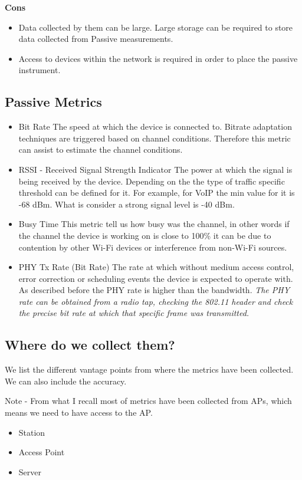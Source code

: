 \textbf{Cons}
\begin{itemize}
	\item Data collected by them can be large. Large storage can be required to store data collected from Passive measurements.
	\item Access to devices within the network is required in order to place the passive instrument.
	
\end{itemize}

\subsection*{Passive Metrics}

\begin{itemize}
	\item Bit Rate
	The speed at which the device is connected to. Bitrate adaptation techniques are triggered based on channel conditions. Therefore this metric can assist to estimate the channel conditions.
	\item RSSI - Received Signal Strength Indicator
	The power at which the signal is being received by the device. Depending on the the type of traffic specific threshold can be defined for it. For example, for VoIP the min value for it is -68 dBm. What is consider a strong signal level is -40 dBm.
	\item Busy Time
	This metric tell us how busy was the channel, in other words if the channel the device is working on is close to 100\% it can be due to contention by other Wi-Fi devices or interference from non-Wi-Fi sources.
	\item PHY Tx Rate (Bit Rate)
	The rate at which without medium access control, error correction or scheduling events the device is expected to operate with. As described before the PHY rate is higher than the bandwidth.
	\emph{The PHY rate can be obtained from a radio tap, checking the 802.11 header and check the precise bit rate at which that specific frame was transmitted.}
\end{itemize}

\subsection{Where do we collect them?}

We list the different vantage points from where the metrics have been collected. We can also include the accuracy.

Note - From what I recall most of metrics have been collected from APs, which means we need to have access to the AP.

\begin{itemize}
	\item Station
	\item Access Point
	\item Server
\end{itemize}
